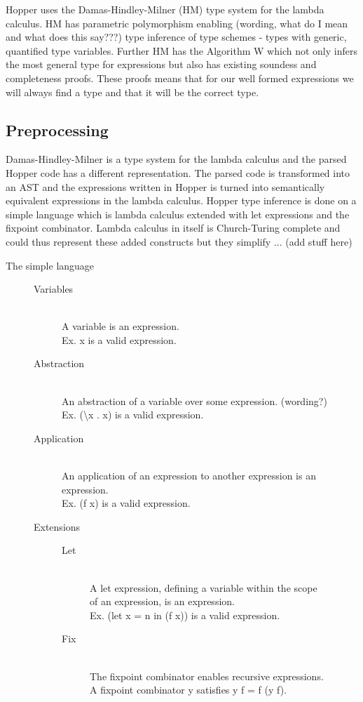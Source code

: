 Hopper uses the Damas-Hindley-Milner (HM) type system for the lambda calculus. HM has parametric polymorphism enabling (wording, what do I mean and what does this say???) type inference of type schemes - types with generic, quantified type variables. Further HM has the Algorithm W which not only infers the most general type for expressions but also has existing soundess and completeness proofs. These proofs means that for our well formed expressions we will always find a type and that it will be the correct type.

\subsection{Preprocessing}

Damas-Hindley-Milner is a type system for the lambda calculus and the parsed Hopper code has a different representation. The parsed code is transformed into an AST and the expressions written in Hopper is turned into semantically equivalent expressions in the lambda calculus. Hopper type inference is done on a simple language which is lambda calculus extended with let expressions and the fixpoint combinator. Lambda calculus in itself is Church-Turing complete and could thus represent these added constructs but they simplify ... (add stuff here)

\begin{description}
\item[The simple language] \hfill
\begin{description}
  \item[Variables] \hfill \\
    A variable is an expression.\\
    Ex. x is a valid expression.
   \item[Abstraction] \hfill \\
    An abstraction of a variable over some expression. (wording?)\\
    Ex. (\textbackslash x . x) is a valid expression.
   \item[Application] \hfill \\
    An application of an expression to another expression is an expression.\\
    Ex. (f x) is a valid expression.
   \item[Extensions] \hfill
\begin{description}
    \item[Let] \hfill \\
      A let expression, defining a variable within the scope\\
      of an expression, is an expression.\\
      Ex. (let x = n in (f x)) is a valid expression. 
    \item[Fix] \hfill \\
      The fixpoint combinator enables recursive expressions.\\
      A fixpoint combinator y satisfies y f = f (y f).
\end{description}
\end{description}
\end{description}


